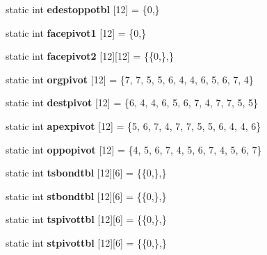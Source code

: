 \begin{DoxyCompactItemize}
static int {\bfseries edestoppotbl} \mbox{[}12\mbox{]} = \{0,\}
\item 
\mbox{\label{classtetgenmesh_af459523fb697a18a4cfd384a15eea491}} 
static int {\bfseries facepivot1} \mbox{[}12\mbox{]} = \{0,\}
\item 
\mbox{\label{classtetgenmesh_abbb55c1b21510a209fd860e8c18a79d1}} 
static int {\bfseries facepivot2} \mbox{[}12\mbox{]}\mbox{[}12\mbox{]} = \{\{0,\},\}
\item 
\mbox{\label{classtetgenmesh_a65e14fb4bf9fa6a240a9441ab73bdec5}} 
static int {\bfseries orgpivot} \mbox{[}12\mbox{]} = \{7, 7, 5, 5, 6, 4, 4, 6, 5, 6, 7, 4\}
\item 
\mbox{\label{classtetgenmesh_a213a06f8f39654014405e4add71073d3}} 
static int {\bfseries destpivot} \mbox{[}12\mbox{]} = \{6, 4, 4, 6, 5, 6, 7, 4, 7, 7, 5, 5\}
\item 
\mbox{\label{classtetgenmesh_a0322a7ed3ee115cb852ae8d46e2b261c}} 
static int {\bfseries apexpivot} \mbox{[}12\mbox{]} = \{5, 6, 7, 4, 7, 7, 5, 5, 6, 4, 4, 6\}
\item 
\mbox{\label{classtetgenmesh_a6ca1afb964b1b34272d978ddbc0686a9}} 
static int {\bfseries oppopivot} \mbox{[}12\mbox{]} = \{4, 5, 6, 7, 4, 5, 6, 7, 4, 5, 6, 7\}
\item 
\mbox{\label{classtetgenmesh_a053685b4d9d852983e842a33a95c31e4}} 
static int {\bfseries tsbondtbl} \mbox{[}12\mbox{]}\mbox{[}6\mbox{]} = \{\{0,\},\}
\item 
\mbox{\label{classtetgenmesh_a8c25d3648eac238fe5cd43ed4b06c040}} 
static int {\bfseries stbondtbl} \mbox{[}12\mbox{]}\mbox{[}6\mbox{]} = \{\{0,\},\}
\item 
\mbox{\label{classtetgenmesh_a9b4b95dfdce4c8c1ae1b4e683bfeca5e}} 
static int {\bfseries tspivottbl} \mbox{[}12\mbox{]}\mbox{[}6\mbox{]} = \{\{0,\},\}
\item 
\mbox{\label{classtetgenmesh_ab90b809e43493efe2b4132ef5b056dba}} 
static int {\bfseries stpivottbl} \mbox{[}12\mbox{]}\mbox{[}6\mbox{]} = \{\{0,\},\}

\end{DoxyCompactItemize}

